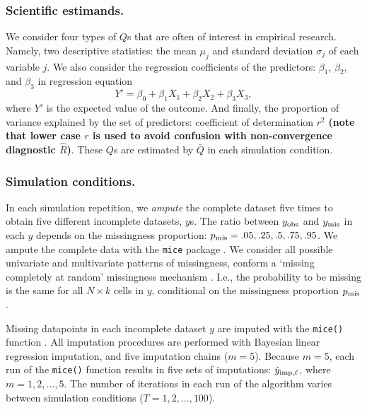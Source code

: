\documentclass[Royal,times,sageh]{sagej}
\begin{document}
\hypertarget{scientific-estimands.}{%
\subsubsection{Scientific estimands.}\label{scientific-estimands.}}

We consider four types of \(Q\)s that are often of interest in empirical research. Namely, two descriptive statistics: the mean \(\mu_j\) and standard deviation \(\sigma_j\) of each variable \(j\). We also consider the regression coefficients of the predictors: \(\beta_1\), \(\beta_2\), and \(\beta_3\) in regression equation
\[Y' = \beta_0 + \beta_1 X_1 + \beta_2 X_2 + \beta_3 X_3,\]
where \(Y'\) is the expected value of the outcome. And finally, the proportion of variance explained by the set of predictors: coefficient of determination \(r^2\) \textbf{(note that lower case \(r\) is used to avoid confusion with non-convergence diagnostic \(\widehat{R}\))}. These \(Q\)s are estimated by \(\bar{Q}\) in each simulation condition.

\hypertarget{simulation-conditions.}{%
\subsubsection{Simulation conditions.}\label{simulation-conditions.}}

In each simulation repetition, we \emph{ampute} the complete dataset five times to obtain five different incomplete datasets, \(y\)s. The ratio between \(y_{\rm obs}\) and \(y_{\rm mis}\) in each \(y\) depends on the missingness proportion: \(p_{\rm mis} =.05,.25,.5,.75,.95\). We ampute the complete data with the \texttt{mice} package \citep[function \texttt{mice::ampute()};][]{mice}. We consider all possible univariate and multivariate patterns of missingness, conform a `missing completely at random' missingness mechanism \citep{rubin87}. I.e., the probability to be missing is the same for all \(N \times k\) cells in \(y\), conditional on the missingness proportion \(p_{\rm mis}\).

Missing datapoints in each incomplete dataset \(y\) are imputed with the \texttt{mice()} function \citep{mice}. All imputation procedures are performed with Bayesian linear regression imputation, and five imputation chains (\(m=5\)). Because \(m=5\), each run of the \texttt{mice()} function results in five sets of imputations: \(\dot y_{\rm imp, \ell}\), where \(m = 1, 2, ..., 5\). The number of iterations in each run of the algorithm varies between simulation conditions (\(T=1,2,...,100\)).
\end{document}
